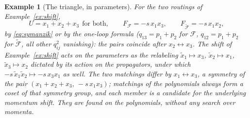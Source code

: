 \documentclass[11pt]{article}
\newtheorem{example}[definition]{Example}
\begin{document}
\begin{example}[The triangle, in parameters]
\label{ex:pak}
For the two routings of Example~\ref{ex:shift},
\begin{equation}
  U = x_1 + x_2 + x_3 \ \ \text{for both},
  \qquad
  F_{\mathcal{F}} = -s\, x_1 x_3 ,
  \qquad
  F_{\widetilde{\mathcal{F}}} = -s\, x_1 x_2 ,
\end{equation}
by \eqref{eq:symanzik} or by the one-loop formula ($q_{13} =
p_1{+}p_2$ for $\mathcal{F}$, $q_{12} = p_1{+}p_2$ for
$\widetilde{\mathcal{F}}$, all other $q_{ij}^2$ vanishing): the
pairs coincide after $x_2 \leftrightarrow x_3$.  The shift of
Example~\ref{ex:shift} acts on the parameters as the relabeling
$\tilde x_1 \mapsto x_3$, $\tilde x_2 \mapsto x_1$,
$\tilde x_3 \mapsto x_2$ dictated by its action on the propagators,
under which $-s\,\tilde x_1\tilde x_2 \mapsto -s\,x_3x_1$ as well.
The two matchings differ by $x_1 \leftrightarrow x_3$, a symmetry of
the pair $(x_1{+}x_2{+}x_3,\ -s\,x_1x_3)$; matchings of the
polynomials always form a coset of that symmetry group, and each
member is a candidate for the underlying momentum shift.  They are
found on the polynomials, without any search over momenta.
\end{example}
\end{document}
